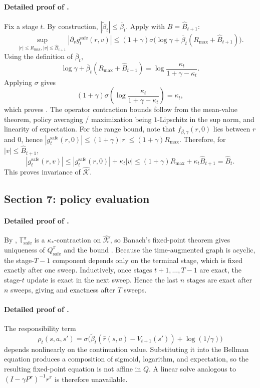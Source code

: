 \documentclass{article}
\theoremstyle{remark}
\newcommand{\safe}{\mathrm{safe}}
\newcommand{\Ksafe}{\widehat{\mathcal K}}
\newcommand{\betacap}{\overline\beta}
\newcommand{\Bhat}{\widehat B}
\begin{document}
\paragraph{Detailed proof of .}
Fix a stage $t$.
By construction, $|\widetilde\beta_t|\le \betacap_t$.
Apply  with $B=\Bhat_{t+1}$:
\[
\sup_{|r|\le R_{\max},|v|\le \Bhat_{t+1}}\left|\partial_v g_t^{\safe}(r,v)\right|
\le (1+\gamma)\sigma\!\bigl(\log\gamma + \betacap_t(R_{\max}+\Bhat_{t+1})\bigr).
\]
Using the definition of $\betacap_t$,
\[
\log\gamma + \betacap_t(R_{\max}+\Bhat_{t+1})=\log\frac{\kappa_t}{1+\gamma-\kappa_t}.
\]
Applying $\sigma$ gives
\[
(1+\gamma)\sigma\!\left(\log\frac{\kappa_t}{1+\gamma-\kappa_t}\right)=\kappa_t,
\]
which proves .
The operator contraction bounds follow from the mean-value theorem, policy averaging / maximization being $1$-Lipschitz in the sup norm, and linearity of expectation.
For the range bound, note that $f_{\beta,\gamma}(r,0)$ lies between $r$ and $0$, hence $|g_t^{\safe}(r,0)|\le (1+\gamma)|r|\le (1+\gamma)R_{\max}$.
Therefore, for $|v|\le \Bhat_{t+1}$,
\[
|g_t^{\safe}(r,v)|\le |g_t^{\safe}(r,0)| + \kappa_t|v|\le (1+\gamma)R_{\max}+\kappa_t\Bhat_{t+1}=\Bhat_t.
\]
This proves invariance of $\Ksafe$.

\subsection{Section 7: policy evaluation}
\label{app:policy-eval}

\paragraph{Detailed proof of .}
By , $\mathbb T_\safe^\pi$ is a $\kappa_*$-contraction on $\Ksafe$, so Banach's fixed-point theorem gives uniqueness of $Q_\safe^\pi$ and the bound .
Because the time-augmented graph is acyclic, the stage-$T-1$ component depends only on the terminal stage, which is fixed exactly after one sweep.
Inductively, once stages $t+1,\dots,T-1$ are exact, the stage-$t$ update is exact in the next sweep.
Hence the last $n$ stages are exact after $n$ sweeps, giving  and exactness after $T$ sweeps.

\paragraph{Detailed proof of .}
The responsibility term
\[
\rho_t(s,a,s')=\sigma\!\bigl(\widetilde\beta_t(\hat r(s,a)-V_{t+1}(s'))+\log(1/\gamma)\bigr)
\]
depends nonlinearly on the continuation value.
Substituting it into the Bellman equation produces a composition of sigmoid, logarithm, and expectation, so the resulting fixed-point equation is not affine in $Q$.
A linear solve analogous to $(I-\gamma P^\pi)^{-1}r^\pi$ is therefore unavailable.
\end{document}
